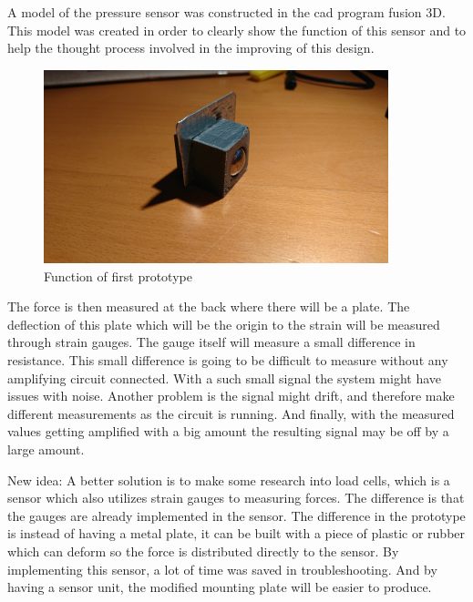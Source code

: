 A model of the pressure sensor was constructed in the \gls{cad} program fusion 3D. This model was created in order to clearly show the function of this sensor and to help the thought process involved in the improving of this design.

\begin{figure}[H]%
\begin{center}
	\includegraphics[width = 10cm]{Figures/Press_sens_prot_1.png}
	\caption{Function of first prototype}
	\label{Press_sens_prot_1}
\end{center}
\end{figure}
 The force is then measured at the back where there will be a plate. The deflection of this plate which will be the origin to the strain will be measured through strain gauges. 
The gauge itself will measure a small difference in resistance. This small difference is going to be difficult to measure without any amplifying circuit connected. With a such small signal the system might have issues with noise. Another problem is the signal might drift, and therefore make different measurements as the circuit is running. And finally, with the measured values getting amplified with a big amount the resulting signal may be off by a large amount. 

New idea:
A better solution is to make some research into load cells, which is a sensor which also utilizes strain gauges to measuring forces. The difference is that the gauges are already implemented in the sensor. The difference in the prototype is instead of having a metal plate, it can be built with a piece of plastic or rubber which can deform so the force is distributed directly to the sensor. By implementing this sensor, a lot of time was saved in troubleshooting. And by having a sensor unit, the modified mounting plate will be easier to produce. 
 
